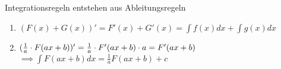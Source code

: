 \documentclass{../tudscript}
\begin{document}
        Integrationsregeln entstehen aus Ableitungsregeln
        \begin{enumerate}
            \item $(F(x) + G(x))' = F'(x) + G'(x) = \int f(x) dx + \int g(x) dx$
            \item $(\frac{1}{a} \cdot F(ax +b))' = \frac{1}{a} \cdot F'(ax +b) \cdot a = F'(ax +b)$
                  $\implies \int F(ax +b) dx = \frac{1}{a} F(ax + b) +c$
        \end{enumerate}
\end{document}
